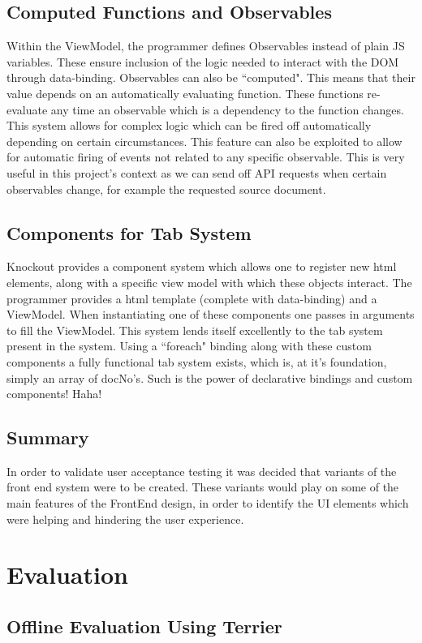\documentclass{l4proj}
\begin{document}
\section{Computed Functions and Observables}
Within the ViewModel, the programmer defines Observables instead of plain JS variables. These ensure inclusion of the logic needed to interact with the DOM through data-binding. Observables can also be ``computed". This means that their value depends on an automatically evaluating function. These functions re-evaluate any time an observable which is a dependency to the function changes. This system allows for complex logic which can be fired off automatically depending on certain circumstances.
This feature can also be exploited to allow for automatic firing of events not related to any specific observable. This is very useful in this project's context as we can send off API requests when certain observables change, for example the requested source document.

\section{Components for Tab System}
Knockout provides a component system which allows one to register new html elements, along with a specific view model with which these objects interact. The programmer provides a html template (complete with data-binding) and a ViewModel. When instantiating one of these components one passes in arguments to fill the ViewModel.
This system lends itself excellently to the tab system present in the system. Using a ``foreach" binding along with these custom components a fully functional tab system exists, which is, at it's foundation, simply an array of docNo's. Such is the power of declarative bindings and custom components! Haha!

\section{Summary}
In order to validate user acceptance testing it was decided that variants of the front end system were to be created. These variants would play on some of the main features of the FrontEnd design, in order to identify the UI elements which were helping and hindering the user experience.

\chapter{Evaluation}
\section{Offline Evaluation Using Terrier}
\end{document}
